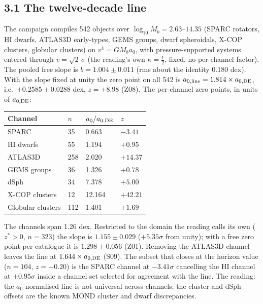 \documentclass[
  11pt,
]{article}
\newcounter{none} %
\begin{document}
\subsection{3.1 The twelve-decade line}\label{the-twelve-decade-line}

The campaign compiles 542 objects over
\(\log_{10} M_b = 2.63\)--\(14.35\) (SPARC rotators, HI dwarfs, ATLAS3D
early-types, GEMS groups, dwarf spheroidals, X-COP clusters, globular
clusters) on \(v^4 = G M_b a_0\), with pressure-supported systems
entered through \(v = \sqrt{2}\,\sigma\) (the reading's own
\(\kappa = \tfrac12\), fixed, no per-channel factor). The pooled free
slope is \(b = 1.004 \pm 0.011\) (rms about the identity 0.180 dex).
With the slope fixed at unity the zero point on all 542 is
\(a_{0,\rm line} = 1.814 \times a_{0,\rm DE}\),
i.e.~\(+0.2585 \pm 0.0288\) dex, \(z = +8.98\) (Z08). The per-channel
zero points, in units of \(a_{0,\rm DE}\):

{\def\LTcaptype{none} %
\begin{longtable}[]{@{}llll@{}}
\toprule\noalign{}
Channel & \(n\) & \(a_0/a_{0,\rm DE}\) & \(z\) \\
\midrule\noalign{}
\endhead
\bottomrule\noalign{}
\endlastfoot
SPARC & 35 & 0.663 & \(-3.41\) \\
HI dwarfs & 55 & 1.194 & \(+0.95\) \\
ATLAS3D & 258 & 2.020 & \(+14.37\) \\
GEMS groups & 36 & 1.326 & \(+0.78\) \\
dSph & 34 & 7.378 & \(+5.00\) \\
X-COP clusters & 12 & 12.164 & \(+42.21\) \\
Globular clusters & 112 & 1.401 & \(+1.69\) \\
\end{longtable}
}

The channels span 1.26 dex. Restricted to the domain the reading calls
its own (\(z^* > 0\), \(n = 323\)) the slope is \(1.155 \pm 0.029\)
(\(+5.35\sigma\) from unity); with a free zero point per catalogue it is
\(1.298 \pm 0.056\) (Z01). Removing the ATLAS3D channel leaves the line
at \(1.644 \times a_{0,\rm DE}\) (S09). The subset that closes at the
horizon value (\(n = 104\), \(z = -0.20\)) is the SPARC channel at
\(-3.41\sigma\) cancelling the HI channel at \(+0.95\sigma\) inside a
channel set selected for agreement with the line. The reading: the
\(a_0\)-normalised line is not universal across channels; the cluster
and dSph offsets are the known MOND cluster and dwarf discrepancies.
\end{document}
